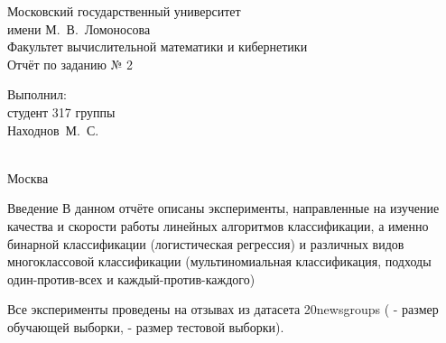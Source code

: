 \documentclass[a4paper,12pt,titlepage,finall]{article}
\begin{document}
	\begin{titlepage}
		\begin{center}
			{\small \sc Московский государственный университет \\имени М.~В.~Ломоносова\\
				Факультет вычислительной математики и кибернетики\\}
			\vfill
			{\Large \sc Отчёт по заданию № 2}\\
		\end{center}
		\begin{flushright}
			\vfill {Выполнил:\\
				студент 317 группы\\
				Находнов~М.~С.\\
				~\\}
		\end{flushright}
		\begin{center}
			\vfill
			{\small Москва\\\the\year}
		\end{center}
	\end{titlepage}
		
\tableofcontents
\newpage
	
	

	
	
\begin{section}{Введение}
	В данном отчёте описаны  эксперименты, направленные на изучение качества и скорости работы линейных алгоритмов классификации, а именно бинарной классификации (логистическая регрессия) и различных видов многоклассовой классификации (мультиномиальная классификация, подходы один-против-всех и каждый-против-каждого)\par
	Все эксперименты проведены на отзывах из датасета 20newsgroups ( - размер обучающей выборки, - размер тестовой выборки).
\end{section}
\end{document}
